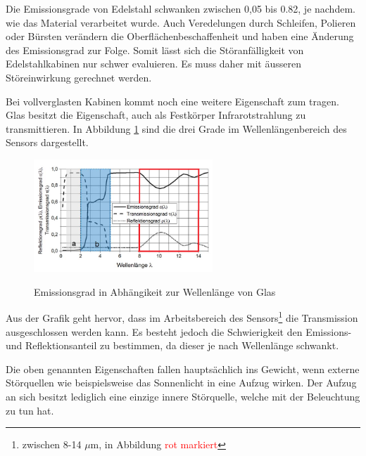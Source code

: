 Die Emissionsgrade von Edelstahl schwanken zwischen 0,05 bis 0.82, je nachdem. wie das Material verarbeitet wurde. Auch Veredelungen durch Schleifen, Polieren oder Bürsten verändern die Oberflächenbeschaffenheit und haben eine Änderung des Emissionsgrad zur Folge. Somit lässt sich die Störanfälligkeit von Edelstahlkabinen nur schwer evaluieren. Es muss daher mit äusseren Störeinwirkung gerechnet werden. 

Bei vollverglasten Kabinen kommt noch eine weitere Eigenschaft zum tragen. Glas besitzt die Eigenschaft, auch als Festkörper Infrarotstrahlung zu transmittieren. In Abbildung \ref{fig:Glas} sind die drei Grade im  Wellenlängenbereich des Sensors dargestellt. 

\begin{figure}[H]
	\centering
	\includegraphics[width=0.6\textwidth]
	{fig/Glas_bearbeitet.png}
	\caption[Emissionsgrad in Abhängikeit zur Wellenlnge]{Emissionsgrad in Abhängikeit zur Wellenlänge von Glas}\cite{Glas} 
	\label{fig:Glas}	
\end{figure}

Aus der Grafik geht hervor, dass im Arbeitsbereich des Sensors\footnote[10]{zwischen 8-14 $\mu$m, in Abbildung \textcolor{red}{rot markiert}} die Transmission ausgeschlossen werden kann. Es besteht jedoch die Schwierigkeit den Emissions- und Reflektionsanteil zu bestimmen, da dieser je nach Wellenlänge schwankt.

Die oben genannten Eigenschaften fallen hauptsächlich ins Gewicht, wenn externe Störquellen wie beispielsweise das Sonnenlicht in eine Aufzug wirken. Der Aufzug an sich besitzt lediglich eine einzige innere Störquelle, welche mit der Beleuchtung zu tun hat. 

